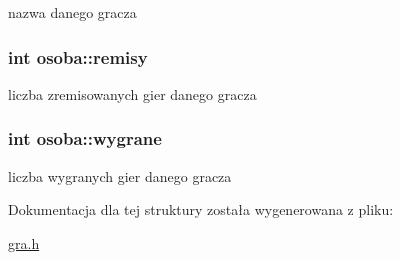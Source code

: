 nazwa danego gracza 

\subsubsection[{\texorpdfstring{remisy}{remisy}}]{\setlength{\rightskip}{0pt plus 5cm}int osoba\+::remisy}\hypertarget{structosoba_a722ff954254b6eb270c954822299a0a0}{}\label{structosoba_a722ff954254b6eb270c954822299a0a0}


liczba zremisowanych gier danego gracza 

\subsubsection[{\texorpdfstring{wygrane}{wygrane}}]{\setlength{\rightskip}{0pt plus 5cm}int osoba\+::wygrane}\hypertarget{structosoba_a295e28af8e47de1d480d19aa61a105ea}{}\label{structosoba_a295e28af8e47de1d480d19aa61a105ea}


liczba wygranych gier danego gracza 



Dokumentacja dla tej struktury została wygenerowana z pliku\+:\begin{DoxyCompactItemize}
\item 
\hyperlink{gra_8h}{gra.\+h}\end{DoxyCompactItemize}
